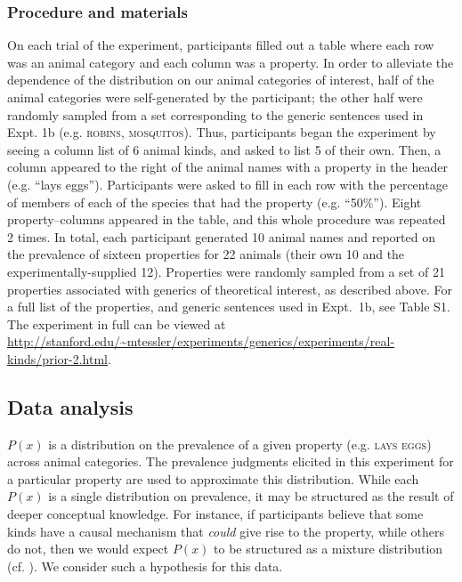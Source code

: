 \documentclass[12pt,letterpaper]{article}
\begin{document}
\subsubsection*{Procedure and materials}
On each trial of the experiment, participants filled out a table where each row was an animal category and each column was a property. 
In order to alleviate the dependence of the distribution on our animal categories of interest, half of the animal categories were self-generated by the participant; the other half were randomly sampled from a set corresponding to the generic sentences used in Expt. 1b (e.g. \textsc{robins, mosquitos}).
Thus, participants began the experiment by seeing a column list of 6 animal kinds, and asked to list 5 of their own. Then, a column appeared to the right of the animal names with a property in the header (e.g. ``lays eggs'').
Participants were asked to fill in each row with the percentage of members of each of the species that had the property (e.g. ``50\%'').
Eight property--columns appeared in the table, and this whole procedure was repeated 2 times. In total, each participant generated 10 animal names and reported on the prevalence of sixteen properties for 22 animals (their own 10 and the experimentally-supplied 12). 
Properties were randomly sampled from a set of 21 properties associated with generics of theoretical interest, as described above.
For a full list of the properties, and generic sentences used in Expt.~1b, see Table S1.
The experiment in full can be viewed at \url{http://stanford.edu/~mtessler/experiments/generics/experiments/real-kinds/prior-2.html}.

\subsection*{Data analysis}
 
 $P(x)$ is a distribution on the prevalence of a given property (e.g. \textsc{lays eggs}) across animal categories. 
 The prevalence judgments elicited in this experiment for a particular property are used to approximate this distribution. 
While each $P(x)$ is a single distribution on prevalence, it may be structured as the result of deeper conceptual knowledge. 
For instance, if participants believe that some kinds have a causal mechanism that \emph{could} give rise to the property, while others do not, then we would expect $P(x)$ to be structured as a mixture distribution (cf. ).
We consider such a hypothesis for this data.
\end{document}
